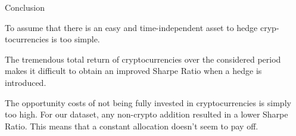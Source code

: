 \begin{frame}{Conclusion}
    \begin{exampleblock}{}
 To assume that there is an easy and time-independent asset to hedge cryp-
tocurrencies is too simple. 
    \end{exampleblock}
        \begin{exampleblock}{}
    The tremendous total return of cryptocurrencies over the considered period
makes it difficult to obtain an improved Sharpe Ratio when a hedge is introduced.  
    \end{exampleblock}
        \begin{exampleblock}{}
The opportunity costs
of not being fully invested in cryptocurrencies is simply too high. For our dataset, any non-crypto
addition resulted in a lower Sharpe Ratio. This means that a constant allocation doesn’t seem to pay off.
    \end{exampleblock}

\end{frame}